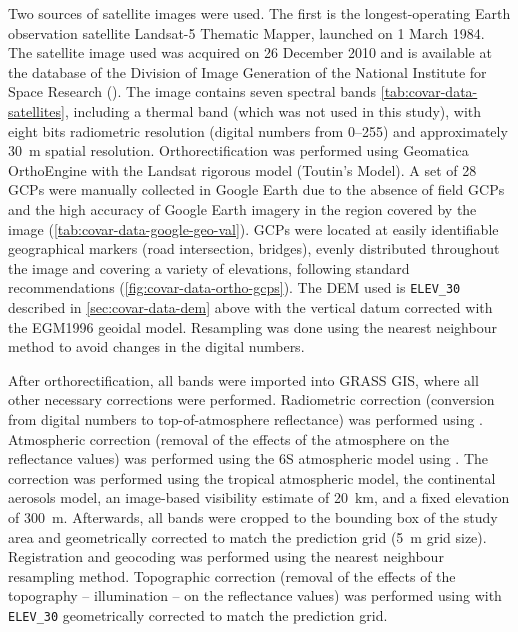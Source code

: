 Two sources of satellite images were used. The first is the longest-operating Earth observation satellite Landsat-5 
Thematic Mapper, launched on \num{1} March \num{1984}. The satellite image used was acquired on \num{26} December  
\num{2010} and is available at the database of the Division of Image Generation of the National Institute for 
Space Research (\inpedgi). The image contains seven spectral bands \autoref{tab:covar-data-satellites}, including a 
thermal band (which was not used in this study), with eight bits radiometric resolution (digital numbers from 
\numrange{0}{255}) and approximately \SI{30}{\m} spatial resolution. Orthorectification was performed using 
Geomatica\textregistered{} OrthoEngine\textregistered{} with the Landsat rigorous model (Toutin's Model). A set of 
\num{28} GCPs were manually collected in Google Earth\textregistered{} due to the absence of field GCPs and the high 
accuracy of Google Earth\textregistered{} imagery in the region covered by the image 
(\autoref{tab:covar-data-google-geo-val}). GCPs were located at easily identifiable geographical markers (road 
intersection, bridges), evenly distributed throughout the image and covering a variety of elevations, following 
standard recommendations \cite{PCIGeomatics2007} (\autoref{fig:covar-data-ortho-gcps}). The DEM used is 
\texttt{ELEV\_30} described in \autoref{sec:covar-data-dem} above with the vertical datum corrected with the EGM1996 
geoidal model. Resampling was done using the nearest neighbour method to avoid changes in the digital numbers.


After orthorectification, all bands were imported into GRASS GIS, where all other necessary corrections were 
performed. Radiometric correction (conversion from digital numbers to top-of-atmosphere reflectance) was performed 
using . Atmospheric correction (removal of the effects of the atmosphere on the 
reflectance values) was performed using the 6S atmospheric model \cite{VermoteEtAl1997} using . The 
correction was performed using the tropical atmospheric model, the continental aerosols model, an image-based 
visibility estimate of \SI{20}{\km}, and a fixed elevation of \SI{300}{\m}. Afterwards, all bands were cropped to 
the bounding box of the study area and geometrically corrected to match the prediction grid (\SI{5}{\m} grid size). 
Registration and geocoding was performed using the nearest neighbour resampling method. Topographic correction 
(removal of the effects of the topography -- illumination -- on the reflectance values) was performed using 
 with \texttt{ELEV\_30} geometrically corrected to match the prediction grid.

